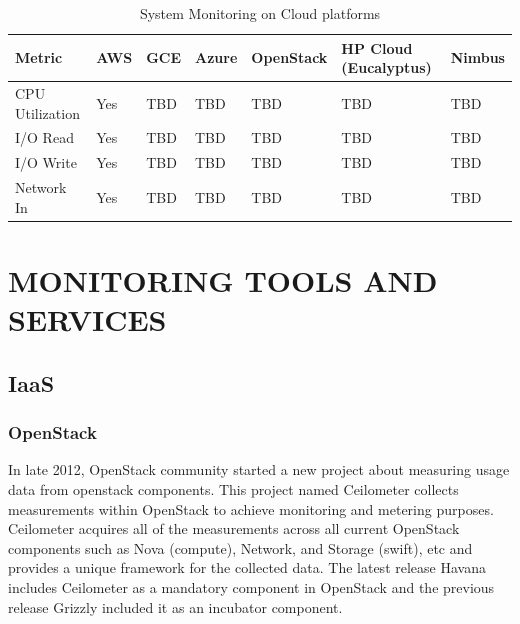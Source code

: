 \documentclass{sig-alternate-05-2015}
\begin{document}
\begin{table}[htb]
\caption{System Monitoring on Cloud platforms}
\begin{scriptsize}
\label{T:SMmetrics}
\bigskip
\begin{center}
\begin{tabular}{p{}p{}p{}p{}p{}p{}p{}}
Metric & AWS & GCE & Azure & OpenStack & HP Cloud (Eucalyptus) & Nimbus \\
\hline
CPU Utilization & Yes & TBD & TBD & TBD & TBD & TBD \\
\hline
I/O Read & Yes & TBD & TBD & TBD & TBD & TBD \\
\hline
I/O Write & Yes & TBD & TBD & TBD & TBD & TBD \\
\hline
Network In & Yes & TBD & TBD & TBD & TBD & TBD \\
\hline
\end{tabular}
\end{center}
\end{scriptsize}
\end{table}

\section{MONITORING TOOLS AND SERVICES}\label{S:tools}

\subsection{IaaS}

\subsubsection{OpenStack}

In late 2012, OpenStack community started a new project about measuring usage data from openstack components. This project named Ceilometer collects measurements within OpenStack to achieve monitoring and metering purposes. Ceilometer acquires all of the measurements across all current OpenStack components such as Nova (compute), Network, and Storage (swift), etc and provides a unique framework for the collected data. The latest release Havana includes Ceilometer as a mandatory component in OpenStack and the previous release Grizzly included it as an incubator component.
\end{document}
